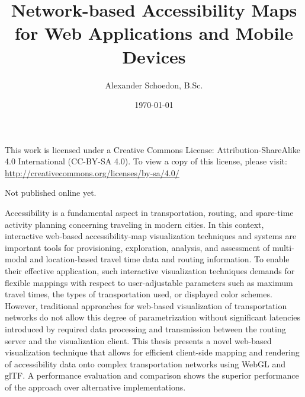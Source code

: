 \documentclass[english]{cgsthesis}
\title{
  \huge Network-based Accessibility Maps\\
  for Web Applications and Mobile Devices
}
\author{Alexander Schoedon, B.Sc.}
\date{\today}
\begin{document}
\frontmatter
\maketitle

\thispagestyle{empty}

{\noindent This work is licensed under a Creative Commons License: Attribution-ShareAlike
4.0 International (CC-BY-SA 4.0). To view a copy of this license, please visit:
\url{http://creativecommons.org/licenses/by-sa/4.0/}}

\vfill

{\noindent Not published online yet.}


\cleardoublepage
{}
Accessibility is a fundamental aspect in transportation, routing, and spare-time
activity planning concerning traveling in modern cities. In this context,
interactive web-based accessibility-map visualization techniques and systems
are important tools for provisioning, exploration, analysis, and assessment of
multi-modal and location-based travel time data and routing information. To
enable their effective application, such interactive visualization techniques
demands for flexible mappings with respect to user-adjustable parameters such
as maximum travel times, the types of transportation used, or displayed color
schemes. However, traditional approaches for web-based visualization of
transportation networks do not allow this degree of parametrization without
significant latencies introduced by required data processing and transmission
between the routing server and the visualization client. This thesis presents
a novel web-based visualization technique that allows for efficient client-side
mapping and rendering of accessibility data onto complex transportation
networks using WebGL and glTF. A performance evaluation and comparison shows
the superior performance of the approach over alternative implementations.




\cleardoublepage
{}
{}
\tableofcontents
\end{document}

